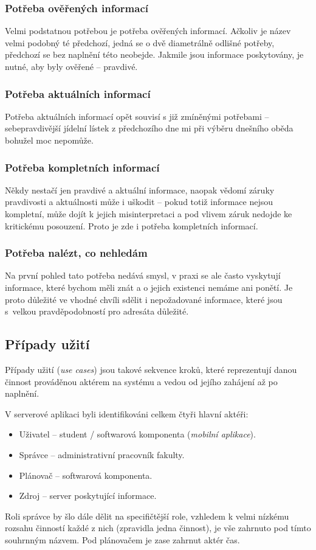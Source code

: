 \subsubsection{Potřeba ověřených informací}
Velmi podstatnou potřebou je potřeba ověřených informací. Ačkoliv je název velmi podobný té předchozí, jedná se o dvě diametrálně odlišné potřeby, předchozí se bez naplnění této neobejde. Jakmile jsou informace poskytovány, je nutné, aby byly ověřené -- pravdivé.

\subsubsection{Potřeba aktuálních informací}
Potřeba aktuálních informací opět souvisí s již zmíněnými potřebami -- sebepravdivější jídelní lístek z předchozího dne mi při výběru dnešního oběda bohužel moc nepomůže.

\subsubsection{Potřeba kompletních informací}
Někdy nestačí jen pravdivé a aktuální informace, naopak vědomí záruky pravdivosti a aktuálnosti může i uškodit -- pokud totiž informace nejsou kompletní, může dojít k jejich misinterpretaci a pod vlivem záruk nedojde ke kritickému posouzení. Proto je zde i potřeba kompletních informací.

\subsubsection{Potřeba nalézt, co nehledám}
Na první pohled tato potřeba nedává smysl, v praxi se ale často vyskytují informace, které bychom měli znát a o jejich existenci nemáme ani ponětí. Je proto důležité ve vhodné chvíli sdělit i nepožadované informace, které jsou s~velkou pravděpodobností pro adresáta důležité.


\subsection{Případy užití}
Případy užití (\textit{use cases}) jsou takové sekvence kroků, které reprezentují danou činnost prováděnou aktérem na systému a vedou od jejího zahájení až po naplnění.

V serverové aplikaci byli identifikováni celkem čtyři hlavní aktéři:
\begin{itemize}
 \item Uživatel -- student / softwarová komponenta (\textit{mobilní aplikace}).
 \item Správce -- administrativní pracovník fakulty.
 \item Plánovač -- softwarová komponenta.
 \item Zdroj -- server poskytující informace.
\end{itemize}
Roli správce by šlo dále dělit na specifičtější role, vzhledem k velmi nízkému rozsahu činností každé z nich (zpravidla jedna činnost), je vše zahrnuto pod tímto souhrnným názvem. Pod plánovačem je zase zahrnut aktér čas.

